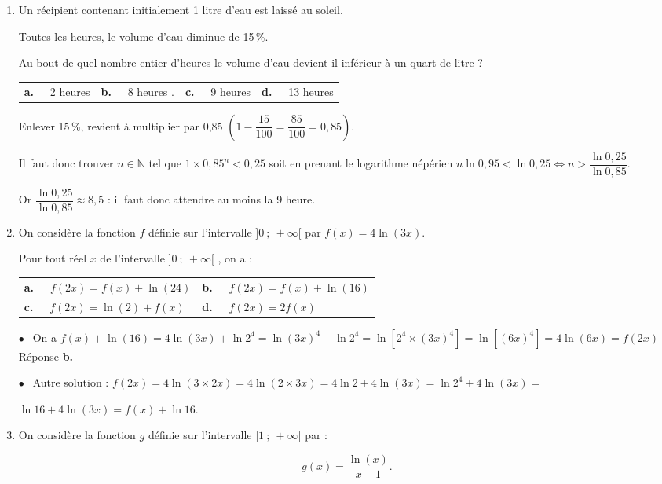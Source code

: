 \documentclass[10pt]{article}
\providecommand{\N}{\mathbb{N}}
\begin{document}
\bigskip
\begin{enumerate}
\item Un récipient contenant initialement 1 litre d'eau est laissé au soleil.

Toutes les heures, le volume d'eau diminue de 15\,\%.

Au bout de quel nombre entier d'heures le volume d'eau devient-il inférieur à un quart de litre ?

\begin{center}
\begin{tabularx}{\linewidth}{*{4}{X}}
\textbf{a.~~} 2 heures &\textbf{b.~~} 8 heures .&\textbf{c.~~} 9 heures
&\textbf{d.~~} 13 heures
\end{tabularx}
\end{center}
Enlever 15\,\%, revient à multiplier par 0,85 $\left(1 - \dfrac{15}{100} = \dfrac{85}{100} = 0,85 \right)$.

Il faut donc trouver $n \in \N$ tel que $1 \times 0,85^n < 0,25$ soit en prenant le logarithme népérien $n\ln 0,95 < \ln 0,25 \iff n > \dfrac{\ln 0,25}{\ln 0,85}$.

Or $\dfrac{\ln 0,25}{\ln 0,85} \approx 8,5$ : il faut donc attendre au moins la 9 heure.
\item  On considère la fonction $f$ définie sur l'intervalle $]0~;~+\infty[$ par $f(x) = 4\ln (3x)$.

Pour tout réel $x$ de l'intervalle $]0~;~+\infty[$ , on a :

\begin{center}
\begin{tabularx}{\linewidth}{*{2}{X}}
\textbf{a.~~} $f(2x) = f(x) + \ln (24)$&\textbf{b.~~} $f(2x) = f(x) + \ln (16)$\\
\textbf{c.~~} $f(2x) = \ln (2) + f(x)$& \textbf{d.~~} $f(2x) = 2f(x)$
\end{tabularx}
\end{center}

$\bullet~~$ On a $f(x) + \ln (16) = 4 \ln (3x) + \ln 2^4= \ln (3x)^4  + \ln 2^4 = \ln \left[2^4 \times (3x)^4\right] = \ln \left[(6x)^4\right] = 4 \ln (6x) = f(2x)$ Réponse \textbf{b.}

$\bullet~~$ Autre solution : $f(2x) = 4\ln (3 \times 2x) = 4 \ln (2 \times 3x) = 4\ln 2 + 4\ln (3x) = \ln 2^4 + 4\ln (3x) =$

$ \ln 16 + 4\ln (3x) = f(x) + \ln 16$.
\item On considère la fonction $g$ définie sur l'intervalle $]1~;~+\infty[$ par : 

\[g(x) = \dfrac{\ln (x)}{x - 1}.\]



\end{enumerate}
\end{document}
